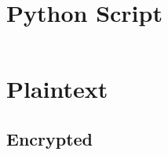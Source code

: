 \documentclass[12pt]{article}
\begin{document}

\newpage
\begin{titlepage}
\begin{tableofcontents}

\end{tableofcontents}
\end{titlepage}


\section{Python Script}
\label{Python Script Section}

\inputminted[breaklines,linenos,bgcolor=AliceBlue]{python3}{Encryption.py}


\section{Plaintext}
\label{Plaintext Section}


\subsection{Encrypted}
\label{Encrypted SubSection}

\inputminted[breaklines,linenos,bgcolor=AliceBlue]{python3}{plaintext.txt.enc.txt}

\end{document}
